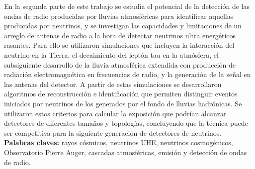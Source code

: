 \begin{titlepage}
En la segunda parte de este trabajo se estudia el potencial de la detecci\'on de las ondas de radio producidas por lluvias atmosf\'ericas para identificar aquellas producidas por neutrinos, y se investigan las capacidades y limitaciones de un arreglo de antenas de radio a la hora de detectar neutrinos ultra energéticos rasantes. 
Para ello se utilizaron simulaciones que incluyen la interacción del neutrino en la Tierra, el decaimiento del lept\'on tau en la atmósfera, el subsiguiente desarrollo de la lluvia atmosférica extendida con producci\'on de radiaci\'on electromagn\'etica en frecuencias de radio, y la generaci\'on de la señal en las antenas del detector.
A partir de estas simulaciones se desarrollaron algoritmos de reconstrucción e identificación que permiten distinguir eventos iniciados por neutrinos de los generados por el fondo de lluvias hadrónicas.
Se utilizaron estos criterios para calcular la exposición que podrían alcanzar detectores de diferentes tamaños y topologías, concluyendo que la técnica puede ser competitiva para la siguiente generación de detectores de neutrinos.
\\[0.2cm]

\noindent
\textbf{Palabras claves: } rayos cósmicos, neutrinos UHE, neutrinos cosmogénicos, Observatorio Pierre Auger, cascadas atmosf\'ericas, emisión y detección de ondas de radio.\\

\end{titlepage}

